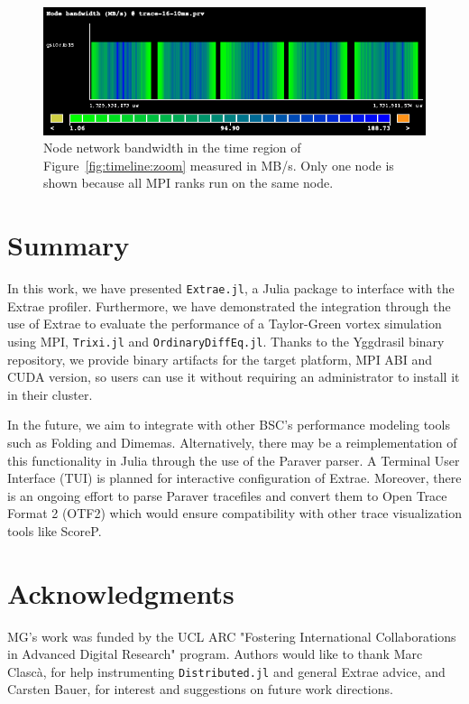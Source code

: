 \documentclass{juliacon}
\newcommand{\jlpkg}[1]{\texttt{#1}}
\newcommand{\extraejl}{\jlpkg{Extrae.jl}}
\begin{document}
\begin{figure}
    \centering
    \includegraphics[width=\linewidth]{Node_bandwidth_(MB_s)@trace-16-10ms.w_legend.png}
    \caption{Node network bandwidth in the time region of Figure~\ref{fig:timeline:zoom} measured in MB/s. Only one node is shown because all MPI ranks run on the same node.}
    \label{fig:node-bw}
\end{figure}

\section{Summary}\label{sec:summary}

In this work, we have presented \extraejl, a Julia package to interface with the Extrae profiler.
Furthermore, we have demonstrated the integration through the use of Extrae to evaluate the performance of a Taylor-Green vortex simulation using MPI, \jlpkg{Trixi.jl} and \jlpkg{OrdinaryDiffEq.jl}.
Thanks to the Yggdrasil binary repository, we provide binary artifacts for the target platform, MPI ABI and CUDA version, so users can use it without requiring an administrator to install it in their cluster.

In the future, we aim to integrate with other BSC's performance modeling tools such as Folding and Dimemas.
Alternatively, there may be a reimplementation of this functionality in Julia through the use of the Paraver parser.
A Terminal User Interface (TUI) is planned for interactive configuration of Extrae.
Moreover, there is an ongoing effort to parse Paraver tracefiles and convert them to Open Trace Format 2 (OTF2) which would ensure compatibility with other trace visualization tools like ScoreP.

\section{Acknowledgments}

MG's work was funded by the UCL ARC "Fostering International Collaborations in Advanced Digital Research" program.
Authors would like to thank Marc Clascà, for help instrumenting \jlpkg{Distributed.jl} and general Extrae advice, and Carsten Bauer, for interest and suggestions on future work directions.


\end{document}
